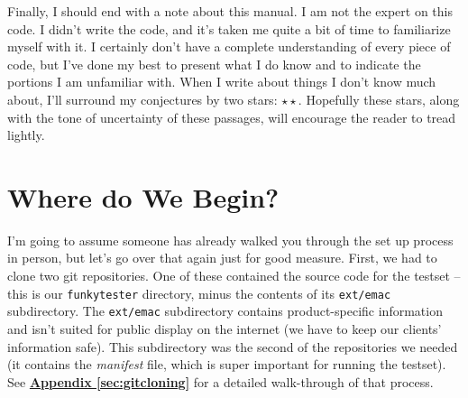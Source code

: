 \documentclass{report}
\newcommand{\dstar}{$\star\star$}	%
\begin{document}
Finally, I should end with a note about this manual. I am not the expert on this code. I didn't write the code, and it's taken me quite a bit of time to familiarize myself with it. I certainly don't have a complete understanding of every piece of code, but I've done my best to present what I do know and to indicate the portions I am unfamiliar with. When I write about things I don't know much about, I'll surround my conjectures by two stars: \dstar. Hopefully these stars, along with the tone of uncertainty of these passages, will encourage the reader to tread lightly.

\section{Where do We Begin?}
I'm going to assume someone has already walked you through the set up process in person, but let's go over that again just for good measure. First, we had to clone two git repositories. One of these contained the source code for the testset -- this is our \texttt{funkytester} directory, minus the contents of its \texttt{ext/emac} subdirectory. The \texttt{ext/emac} subdirectory contains product-specific information and isn't suited for public display on the internet (we have to keep our clients' information safe). This subdirectory was the second of the repositories we needed (it contains the \textit{manifest} file, which is super important for running the testset). See \hyperref[sec:gitcloning]{\textbf{Appendix \ref{sec:gitcloning}}} for a detailed walk-through of that process.\\

\end{document}
